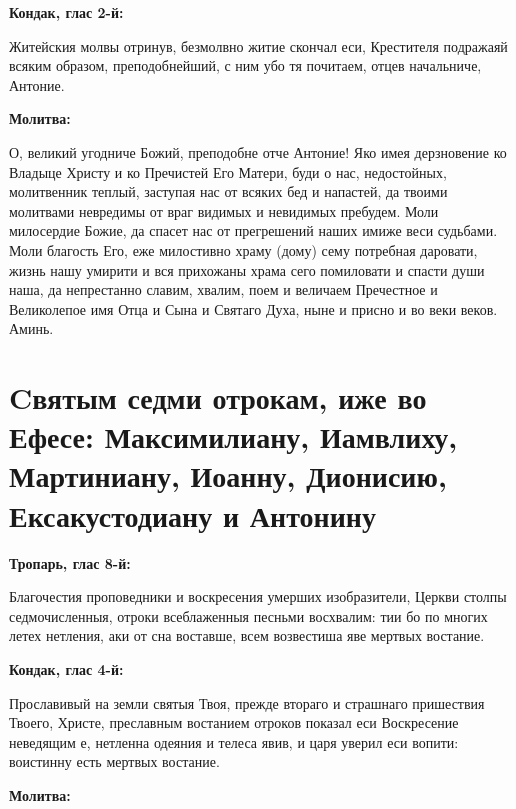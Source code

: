 \medskip


\bfseries Кондак, глас 2-й:\normalfont{}\nopagebreak


Житейския молвы отринув, безмолвно житие скончал еси, Крестителя подражаяй всяким образом, преподобнейший, с ним убо тя почитаем, отцев начальниче, Антоние.


\medskip


\bfseries Молитва:\normalfont{}\nopagebreak


О, великий угодниче Божий, преподобне отче Антоние! Яко имея дерзновение ко Владыце Христу и ко Пречистей Его Матери, буди о нас, недостойных, молитвенник теплый, заступая нас от всяких бед и напастей, да твоими молитвами невредимы от враг видимых и невидимых пребудем. Моли милосердие Божие, да спасет нас от прегрешений наших имиже веси судьбами. Моли благость Его, еже милостивно храму (дому) сему потребная даровати, жизнь нашу умирити и вся прихожаны храма сего помиловати и спасти души наша, да непрестанно славим, хвалим, поем и величаем Пречестное и Великолепое имя Отца и Сына и Святаго Духа, ныне и присно и во веки веков. Аминь.
\mychapterending


 

\section{Cвятым седми отрокам, иже во Ефесе: Максимилиану, Иамвлиху, Мартиниану, Иоанну, Дионисию, Ексакустодиану и Антонину}
 


\bfseries Тропарь, глас 8-й:\normalfont{}\nopagebreak


Благочестия проповедники и воскресения умерших изобразители, Церкви столпы седмочисленныя, отроки всеблаженныя песньми восхвалим: тии бо по многих летех нетления, аки от сна воставше, всем возвестиша яве мертвых востание.


\medskip


\bfseries Кондак, глас 4-й:\normalfont{}\nopagebreak


Прославивый на земли святыя Твоя, прежде втораго и страшнаго пришествия Твоего, Христе, преславным востанием отроков показал еси Воскресение неведящим е, нетленна одеяния и телеса явив, и царя уверил еси вопити: воистинну есть мертвых востание.


\medskip


\bfseries Молитва:\normalfont{}\nopagebreak


